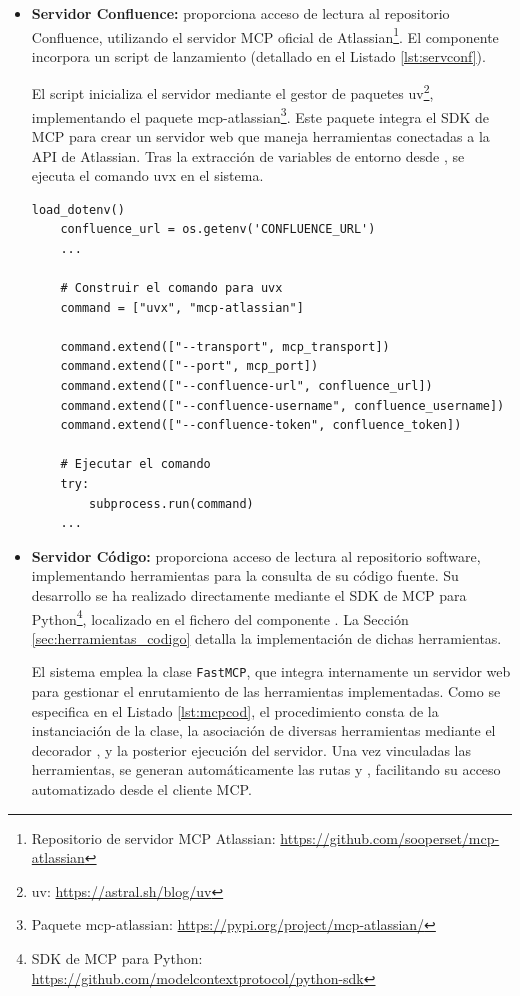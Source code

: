 \begin{itemize}
  \item \textbf{Servidor Confluence:} proporciona acceso de lectura al repositorio Confluence, utilizando el servidor MCP oficial de Atlassian\footnote{Repositorio de servidor MCP Atlassian: \url{https://github.com/sooperset/mcp-atlassian}}. El componente  incorpora un script de lanzamiento  (detallado en el Listado \ref{lst:servconf}).

    El script inicializa el servidor mediante el gestor de paquetes uv\footnote{uv: \url{https://astral.sh/blog/uv}}, implementando el paquete mcp-atlassian\footnote{Paquete mcp-atlassian: \url{https://pypi.org/project/mcp-atlassian/}}. Este paquete integra el SDK de MCP para crear un servidor web que maneja herramientas conectadas a la API de Atlassian. Tras la extracción de variables de entorno desde , se ejecuta el comando uvx en el sistema.
    \begin{lstlisting}[caption={\protect\opus{launch_mcp_server_confluence.py}: ejecución de lanzamiento del servidor MCP Confluence},label={lst:servconf}]
    load_dotenv() 
    confluence_url = os.getenv('CONFLUENCE_URL')
    ...

    # Construir el comando para uvx
    command = ["uvx", "mcp-atlassian"]
    
    command.extend(["--transport", mcp_transport])
    command.extend(["--port", mcp_port]) 
    command.extend(["--confluence-url", confluence_url])
    command.extend(["--confluence-username", confluence_username])
    command.extend(["--confluence-token", confluence_token])

    # Ejecutar el comando
    try:
        subprocess.run(command)
    ...
\end{lstlisting}

\item\textbf{Servidor Código: }proporciona acceso de lectura al repositorio software, implementando herramientas para la consulta de su código fuente. Su desarrollo se ha realizado directamente mediante el SDK de MCP para Python\footnote{SDK de MCP para Python: \url{https://github.com/modelcontextprotocol/python-sdk}}, localizado en el fichero  del componente . La Sección \ref{sec:herramientas_codigo} detalla la implementación de dichas herramientas.

  El sistema emplea la clase \texttt{FastMCP}, que integra internamente un servidor web para gestionar el enrutamiento de las herramientas implementadas. Como se especifica en el Listado \ref{lst:mcpcod}, el procedimiento consta de la instanciación de la clase, la asociación de diversas herramientas mediante el decorador , y la posterior ejecución del servidor. Una vez vinculadas las herramientas, se generan automáticamente las rutas  y , facilitando su acceso automatizado desde el cliente MCP.


\end{itemize}
